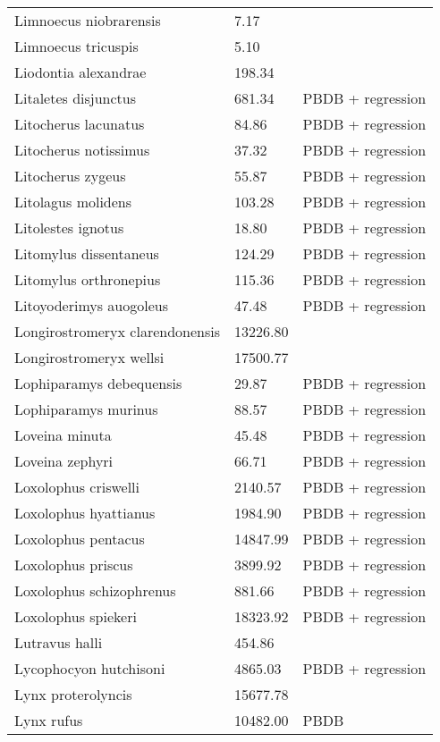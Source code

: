\documentclass{article}
\begin{document}
\begin{center}
\begin{longtable}{p{} p{} p{} }
  Limnoecus niobrarensis & 7.17 & \cite{Tomiya2013} \\ 
  Limnoecus tricuspis & 5.10 & \cite{Tomiya2013} \\ 
  Liodontia alexandrae & 198.34 & \cite{Tomiya2013} \\ 
  Litaletes disjunctus & 681.34 & PBDB + regression \\ 
  Litocherus lacunatus & 84.86 & PBDB + regression \\ 
  Litocherus notissimus & 37.32 & PBDB + regression \\ 
  Litocherus zygeus & 55.87 & PBDB + regression \\ 
  Litolagus molidens & 103.28 & PBDB + regression \\ 
  Litolestes ignotus & 18.80 & PBDB + regression \\ 
  Litomylus dissentaneus & 124.29 & PBDB + regression \\ 
  Litomylus orthronepius & 115.36 & PBDB + regression \\ 
  Litoyoderimys auogoleus & 47.48 & PBDB + regression \\ 
  Longirostromeryx clarendonensis & 13226.80 & \cite{Tomiya2013} \\ 
  Longirostromeryx wellsi & 17500.77 & \cite{Tomiya2013} \\ 
  Lophiparamys debequensis & 29.87 & PBDB + regression \\ 
  Lophiparamys murinus & 88.57 & PBDB + regression \\ 
  Loveina minuta & 45.48 & PBDB + regression \\ 
  Loveina zephyri & 66.71 & PBDB + regression \\ 
  Loxolophus criswelli & 2140.57 & PBDB + regression \\ 
  Loxolophus hyattianus & 1984.90 & PBDB + regression \\ 
  Loxolophus pentacus & 14847.99 & PBDB + regression \\ 
  Loxolophus priscus & 3899.92 & PBDB + regression \\ 
  Loxolophus schizophrenus & 881.66 & PBDB + regression \\ 
  Loxolophus spiekeri & 18323.92 & PBDB + regression \\ 
  Lutravus halli & 454.86 & \cite{Tomiya2013} \\ 
  Lycophocyon hutchisoni & 4865.03 & PBDB + regression \\ 
  Lynx proterolyncis & 15677.78 & \cite{Tomiya2013} \\ 
  Lynx rufus & 10482.00 & PBDB \\ 

\end{longtable}
\end{center}
\end{document}

